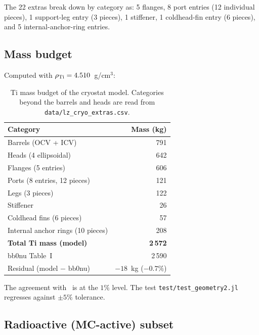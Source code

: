 \documentclass[11pt,a4paper]{article}
\begin{document}
The 22 extras break down by category as: 5 flanges, 8 port
entries (12 individual pieces), 1 support-leg entry (3 pieces),
1 stiffener, 1 coldhead-fin entry (6 pieces), and 5
internal-anchor-ring entries.

\subsection{Mass budget}

Computed with $\rho_{\rm Ti} = 4.510$~g/cm$^3$:

\begin{table}[h]
  \centering
  \footnotesize
  \caption{Ti mass budget of the cryostat model. Categories beyond
  the barrels and heads are read from
  \texttt{data/lz\_cryo\_extras.csv}.}
  \label{tab:cryostat-budget}
  \begin{tabular}{lr}
    \toprule
    Category & Mass (kg) \\
    \midrule
    Barrels (OCV + ICV)             & 791  \\
    Heads (4 ellipsoidal)           & 642  \\
    Flanges (5 entries)             & 606  \\
    Ports (8 entries, 12 pieces)    & 121  \\
    Legs (3 pieces)                 & 122  \\
    Stiffener                       &  26  \\
    Coldhead fins (6 pieces)        &  57  \\
    Internal anchor rings (10 pieces) & 208  \\
    \midrule
    \textbf{Total Ti mass (model)}  & \textbf{2\,572}  \\
    bb0nu Table~I~\cite{LZ-bbonu}   & 2\,590  \\
    Residual (model $-$ bb0nu)      & $-18$~kg ($-0.7\%$) \\
    \bottomrule
  \end{tabular}
\end{table}

The agreement with~\cite{LZ-bbonu} is at the $1\%$ level. The
test \texttt{test/test\_geometry2.jl} regresses against $\pm 5\%$
tolerance.

\subsection{Radioactive (MC-active) subset}
\end{document}

